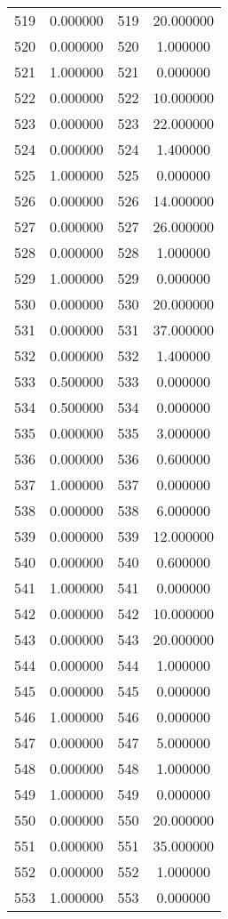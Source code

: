 \documentclass[12pt]{article}
\begin{document}
\begin{longtable}{@{}cccc@{}}
519 & 0.000000 & 519 & 20.000000 \\
520 & 0.000000 & 520 & 1.000000 \\
521 & 1.000000 & 521 & 0.000000 \\
522 & 0.000000 & 522 & 10.000000 \\
523 & 0.000000 & 523 & 22.000000 \\
524 & 0.000000 & 524 & 1.400000 \\
525 & 1.000000 & 525 & 0.000000 \\
526 & 0.000000 & 526 & 14.000000 \\
527 & 0.000000 & 527 & 26.000000 \\
528 & 0.000000 & 528 & 1.000000 \\
529 & 1.000000 & 529 & 0.000000 \\
530 & 0.000000 & 530 & 20.000000 \\
531 & 0.000000 & 531 & 37.000000 \\
532 & 0.000000 & 532 & 1.400000 \\
533 & 0.500000 & 533 & 0.000000 \\
534 & 0.500000 & 534 & 0.000000 \\
535 & 0.000000 & 535 & 3.000000 \\
536 & 0.000000 & 536 & 0.600000 \\
537 & 1.000000 & 537 & 0.000000 \\
538 & 0.000000 & 538 & 6.000000 \\
539 & 0.000000 & 539 & 12.000000 \\
540 & 0.000000 & 540 & 0.600000 \\
541 & 1.000000 & 541 & 0.000000 \\
542 & 0.000000 & 542 & 10.000000 \\
543 & 0.000000 & 543 & 20.000000 \\
544 & 0.000000 & 544 & 1.000000 \\
545 & 0.000000 & 545 & 0.000000 \\
546 & 1.000000 & 546 & 0.000000 \\
547 & 0.000000 & 547 & 5.000000 \\
548 & 0.000000 & 548 & 1.000000 \\
549 & 1.000000 & 549 & 0.000000 \\
550 & 0.000000 & 550 & 20.000000 \\
551 & 0.000000 & 551 & 35.000000 \\
552 & 0.000000 & 552 & 1.000000 \\
553 & 1.000000 & 553 & 0.000000 \\

\end{longtable}
\end{document}
